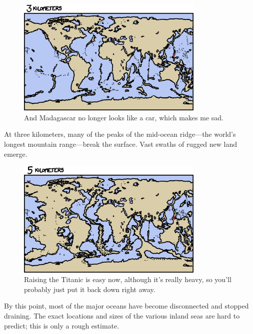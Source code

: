 {\begin{figure}[!htbp]
\centering
\includegraphics[scale=0.5, max width=0.8\textwidth]{imgs/a/53/drain_3km.png}
\caption{And Madagascar no longer looks like a car, which makes me sad.}
\end{figure}

{At three kilometers, many of the peaks of the mid-ocean ridge—the world's longest mountain range—break the surface. Vast swaths of rugged new land emerge.}

\begin{figure}[!htbp]
\centering
\includegraphics[scale=0.5, max width=0.8\textwidth]{imgs/a/53/drain_5km.png}
\caption{Raising the Titanic is easy now, although it's really heavy, so you'll probably just put it back down right away.}
\end{figure}

{By this point, most of the major oceans have become disconnected and stopped draining. The exact locations and sizes of the various inland seas are hard to predict; this is only a rough estimate.}

}
